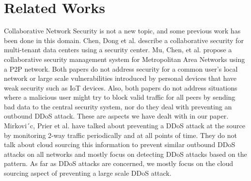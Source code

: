 \section{Related Works}
\label{sec:related}

Collaborative Network Security is not a new topic, and some previous work has been done in this domain. Chen,  Dong et al. \cite {collaborative} describe a collaborative security for multi-tenant data centers using a security center. Mu, Chen, et al. \cite {metro} propose a collaborative security management system for Metropolitan Area Networks using a P2P network. Both papers do not address security for a common user's local network or large scale vulnerabilities introduced by personal devices that have weak security such as IoT devices. Also, both papers do not address situations where a malicious user might try to block valid traffic for all peers by sending bad data to the central security system, nor do they deal with preventing an outbound DDoS attack. These are aspects we have dealt with in our paper. Mirkovi´c, Prier et al. \cite{attackddos} have talked about preventing a DDoS attack at the source by monitoring 2-way traffic periodically and at all points of time. They do not talk about cloud sourcing this information to prevent similar outbound DDoS attacks on all networks and mostly focus on detecting DDoS attacks based on the pattern. As far as DDoS attacks are concerned, we mostly focus on the cloud sourcing aspect of preventing a large scale DDoS attack.